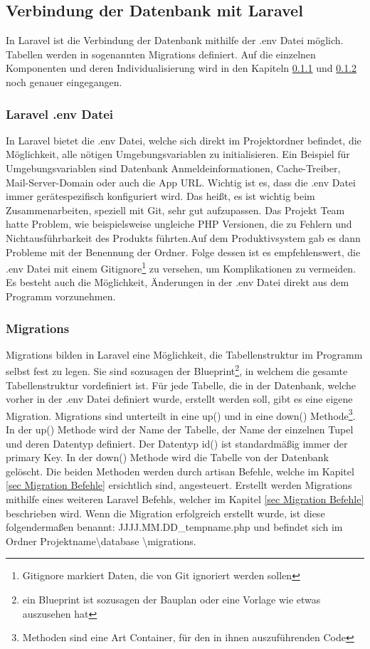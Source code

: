 \newpage
\subsection{Verbindung der Datenbank mit Laravel}
In Laravel ist die Verbindung  der Datenbank mithilfe der .env Datei möglich. Tabellen werden in sogenannten Migrations definiert. Auf die einzelnen Komponenten und deren Individualisierung wird in den Kapiteln \ref{sec:Laravel .env Datei} und \ref{sec:Migrations} noch genauer eingegangen.
\subsubsection{Laravel .env Datei } \label{sec:Laravel .env Datei}
In Laravel bietet die .env Datei, welche sich direkt im Projektordner befindet, die Möglichkeit, alle nötigen Umgebungsvariablen zu initialisieren. Ein Beispiel für Umgebungsvariablen sind Datenbank Anmeldeinformationen, Cache-Treiber, Mail-Server-Domain oder auch die App URL. Wichtig ist es, dass die .env Datei immer gerätespezifisch konfiguriert wird. Das heißt, es ist wichtig beim Zusammenarbeiten, speziell mit Git, sehr gut aufzupassen. Das Projekt Team hatte Problem, wie beispielsweise ungleiche PHP Versionen, die zu Fehlern und Nichtausführbarkeit des Produkts führten.Auf dem Produktivsystem gab es dann Probleme mit der Benennung der Ordner. Folge dessen ist es empfehlenswert, die .env Datei  mit einem Gitignore\footnote{Gitignore markiert Daten, die von Git ignoriert werden sollen} zu versehen, um Komplikationen zu vermeiden. Es besteht auch die Möglichkeit,  Änderungen in der .env Datei direkt aus dem Programm vorzunehmen. 

\subsubsection{Migrations}\label{sec:Migrations}
Migrations bilden in Laravel eine Möglichkeit, die Tabellenstruktur im Programm selbst fest zu legen. Sie sind sozusagen der Blueprint\footnote{ein Blueprint ist sozusagen der Bauplan oder eine Vorlage wie etwas auszusehen hat}, in welchem die gesamte Tabellenstruktur vordefiniert ist. Für jede Tabelle, die in der Datenbank, welche vorher in der  .env Datei  definiert wurde, erstellt werden soll, gibt es eine eigene Migration. Migrations sind unterteilt in eine up() und in eine down()  Methode\footnote{Methoden sind eine Art Container, für den in ihnen auszuführenden Code}. In der up() Methode wird der Name der Tabelle, der Name der einzelnen Tupel und deren Datentyp definiert. Der Datentyp id() ist standardmäßig immer der primary Key. 
In der down() Methode wird die Tabelle von der Datenbank gelöscht. Die beiden Methoden werden durch artisan Befehle, welche im Kapitel \ref{sec Migration Befehle} ersichtlich sind, angesteuert. 
Erstellt werden Migrations mithilfe eines weiteren Laravel Befehls, welcher im Kapitel \ref{sec Migration Befehle} beschrieben wird. Wenn die Migration erfolgreich erstellt wurde, ist diese folgendermaßen benannt: JJJJ.MM.DD\_tempname.php und befindet sich im Ordner Projektname\textbackslash database \textbackslash migrations.


